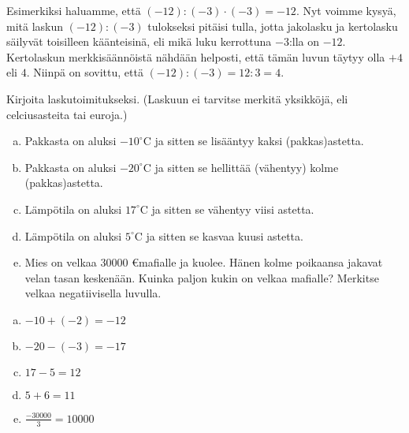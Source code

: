Esimerkiksi haluamme, että $(-12):(-3)\cdot (-3)=-12$. Nyt voimme kysyä, mitä laskun $(-12):(-3)$ tulokseksi pitäisi tulla, jotta jakolasku ja kertolasku säilyvät toisilleen käänteisinä, eli mikä luku kerrottuna $-3$:lla on $-12$. Kertolaskun merkkisäännöistä nähdään helposti, että tämän luvun täytyy olla $+4$ eli $4$. Niinpä on sovittu, että $(-12):(-3)=12:3=4$.

\begin{tehtava}
Kirjoita laskutoimitukseksi. (Laskuun ei tarvitse merkitä yksikköjä, eli celciusasteita tai euroja.)
\begin{enumerate}[a)]
\item Pakkasta on aluksi $-10^{\circ}$C ja sitten se lisääntyy kaksi (pakkas)astetta.
\item Pakkasta on aluksi $-20^{\circ}$C ja sitten se hellittää (vähentyy) kolme (pakkas)astetta.
\item Lämpötila on aluksi $17^{\circ}$C ja sitten se vähentyy viisi astetta.
\item Lämpötila on aluksi $5^{\circ}$C ja sitten se kasvaa kuusi astetta.
\item Mies on velkaa $30 000$ \euro mafialle ja kuolee. Hänen kolme poikaansa jakavat velan tasan keskenään. Kuinka paljon kukin on velkaa mafialle? Merkitse velkaa negatiivisella luvulla.
\end{enumerate}
\begin{vastaus}
\begin{enumerate}[a)]
\item $-10+(-2)=-12$
\item $-20-(-3)=-17$
\item $17-5=12$
\item $5+6=11$
\item $\frac{-30 000}{3}=10 000$
\end{enumerate}
\end{vastaus}
\end{tehtava}



